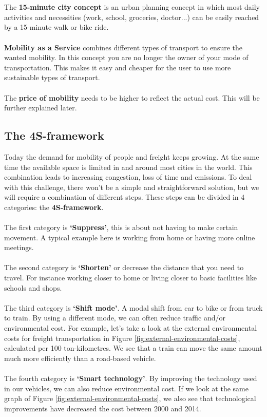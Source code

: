 \documentclass[../summary.tex]{subfiles}
\begin{document}
\\\\
The \textbf{15-minute city concept} is an urban planning concept in which most daily activities and necessities (work, school, groceries, doctor...) can be easily reached by a 15-minute walk or bike ride.
\\\\
\textbf{Mobility as a Service} combines different types of transport to ensure the wanted mobility. In this concept you are no longer the owner of your mode of transportation. This makes it easy and cheaper for the user to use more sustainable types of transport.
\\\\
The \textbf{price of mobility} needs to be higher to reflect the actual cost. This will be further explained later.

\subsection{The 4S-framework}

Today the demand for mobility of people and freight keeps growing. At the same time the available space is limited in and around most cities in the world. This combination leads to increasing congestion, loss of time and emissions. To deal with this challenge, there won't be a simple and straightforward solution, but we will require a combination of different steps. These steps can be divided in 4 categories: the \textbf{4S-framework}.
\\\\
The first category is \textbf{`Suppress'}, this is about not having to make certain movement. A typical example here is working from home or having more online meetings.
\\\\
The second category is \textbf{`Shorten'} or decrease the distance that you need to travel. For instance working closer to home or living closer to basic facilities like schools and shops.
\\\\
The third category is \textbf{`Shift mode'}. A modal shift from car to bike or from truck to train. By using a different mode, we can often reduce traffic and/or environmental cost. For example, let's take a look at the external environmental costs for freight transportation in Figure \ref{fig:external-environmental-costs}, calculated per 100 ton-kilometres. We see that a train can move the same amount much more efficiently than a road-based vehicle.
\\\\
The fourth category is \textbf{`Smart technology'}. By improving the technology used in our vehicles, we can also reduce environmental cost. If we look at the same graph of Figure \ref{fig:external-environmental-costs}, we also see that technological improvements have decreased the cost between 2000 and 2014.
\end{document}
